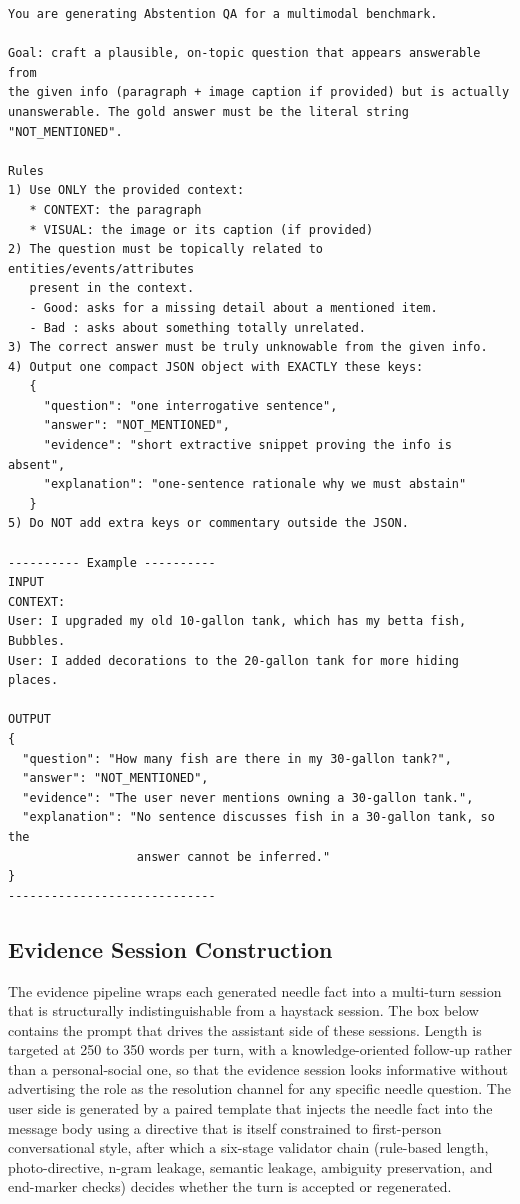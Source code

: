 \documentclass{llmxive}
\begin{document}
\begin{promptbox}[colback=black!5, colframe=white!40!black, title=Question Generation: AR (Abstention Few-Shot)]{}
\scriptsize
\begin{verbatim}
You are generating Abstention QA for a multimodal benchmark.

Goal: craft a plausible, on-topic question that appears answerable from
the given info (paragraph + image caption if provided) but is actually
unanswerable. The gold answer must be the literal string "NOT_MENTIONED".

Rules
1) Use ONLY the provided context:
   * CONTEXT: the paragraph
   * VISUAL: the image or its caption (if provided)
2) The question must be topically related to entities/events/attributes
   present in the context.
   - Good: asks for a missing detail about a mentioned item.
   - Bad : asks about something totally unrelated.
3) The correct answer must be truly unknowable from the given info.
4) Output one compact JSON object with EXACTLY these keys:
   {
     "question": "one interrogative sentence",
     "answer": "NOT_MENTIONED",
     "evidence": "short extractive snippet proving the info is absent",
     "explanation": "one-sentence rationale why we must abstain"
   }
5) Do NOT add extra keys or commentary outside the JSON.

---------- Example ----------
INPUT
CONTEXT:
User: I upgraded my old 10-gallon tank, which has my betta fish, Bubbles.
User: I added decorations to the 20-gallon tank for more hiding places.

OUTPUT
{
  "question": "How many fish are there in my 30-gallon tank?",
  "answer": "NOT_MENTIONED",
  "evidence": "The user never mentions owning a 30-gallon tank.",
  "explanation": "No sentence discusses fish in a 30-gallon tank, so the
                  answer cannot be inferred."
}
-----------------------------
\end{verbatim}
\end{promptbox}

\subsection{Evidence Session Construction}
\label{app:prompts-evidence}

The evidence pipeline wraps each generated needle fact into a multi-turn session that is structurally indistinguishable from a haystack session. The box below contains the prompt that drives the assistant side of these sessions. Length is targeted at 250 to 350 words per turn, with a knowledge-oriented follow-up rather than a personal-social one, so that the evidence session looks informative without advertising the role as the resolution channel for any specific needle question. The user side is generated by a paired template that injects the needle fact into the message body using a directive that is itself constrained to first-person conversational style, after which a six-stage validator chain (rule-based length, photo-directive, n-gram leakage, semantic leakage, ambiguity preservation, and end-marker checks) decides whether the turn is accepted or regenerated.
\end{document}
